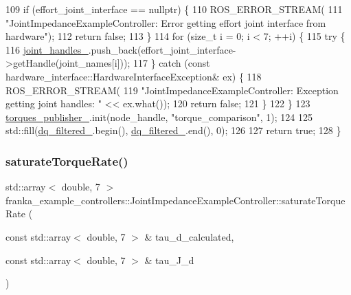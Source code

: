 \begin{DoxyCode}
109   \textcolor{keywordflow}{if} (effort\_joint\_interface == \textcolor{keyword}{nullptr}) \{
110     ROS\_ERROR\_STREAM(
111         \textcolor{stringliteral}{"JointImpedanceExampleController: Error getting effort joint interface from hardware"});
112     \textcolor{keywordflow}{return} \textcolor{keyword}{false};
113   \}
114   \textcolor{keywordflow}{for} (\textcolor{keywordtype}{size\_t} i = 0; i < 7; ++i) \{
115     \textcolor{keywordflow}{try} \{
116       \hyperlink{classfranka__example__controllers_1_1JointImpedanceExampleController_a64340fe9c37cfbdacac36129ef8f1504}{joint\_handles\_}.push\_back(effort\_joint\_interface->getHandle(joint\_names[i]));
117     \} \textcolor{keywordflow}{catch} (\textcolor{keyword}{const} hardware\_interface::HardwareInterfaceException& ex) \{
118       ROS\_ERROR\_STREAM(
119           \textcolor{stringliteral}{"JointImpedanceExampleController: Exception getting joint handles: "} << ex.what());
120       \textcolor{keywordflow}{return} \textcolor{keyword}{false};
121     \}
122   \}
123   \hyperlink{classfranka__example__controllers_1_1JointImpedanceExampleController_a7853d80a8b3a142be8825e895a70d20d}{torques\_publisher\_}.init(node\_handle, \textcolor{stringliteral}{"torque\_comparison"}, 1);
124 
125   std::fill(\hyperlink{classfranka__example__controllers_1_1JointImpedanceExampleController_a003bd809f7a92fdf81bd63c57f414cf2}{dq\_filtered\_}.begin(), \hyperlink{classfranka__example__controllers_1_1JointImpedanceExampleController_a003bd809f7a92fdf81bd63c57f414cf2}{dq\_filtered\_}.end(), 0);
126 
127   \textcolor{keywordflow}{return} \textcolor{keyword}{true};
128 \}
\end{DoxyCode}
\mbox{\label{classfranka__example__controllers_1_1JointImpedanceExampleController_a246799d505d7ebedb1c75d8e9f251a01}} 
\subsubsection{\texorpdfstring{saturate\+Torque\+Rate()}{saturateTorqueRate()}}
{\footnotesize\ttfamily std\+::array$<$ double, 7 $>$ franka\+\_\+example\+\_\+controllers\+::\+Joint\+Impedance\+Example\+Controller\+::saturate\+Torque\+Rate (\begin{DoxyParamCaption}\item[{const std\+::array$<$ double, 7 $>$ \&}]{tau\+\_\+d\+\_\+calculated,  }\item[{const std\+::array$<$ double, 7 $>$ \&}]{tau\+\_\+\+J\+\_\+d }\end{DoxyParamCaption})\hspace{0.3cm}{\ttfamily [private]}}



